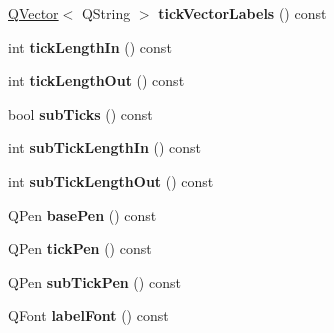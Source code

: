 \begin{DoxyCompactItemize}
\item 
\hyperlink{class_q_vector}{Q\+Vector}$<$ Q\+String $>$ {\bfseries tick\+Vector\+Labels} () const \hypertarget{class_q_c_p_axis_a64e6fa81f943ad33dcaf3fa606687b93}{}\label{class_q_c_p_axis_a64e6fa81f943ad33dcaf3fa606687b93}

\item 
int {\bfseries tick\+Length\+In} () const \hypertarget{class_q_c_p_axis_a59265d65c5034695ac2578bccbbb0f4a}{}\label{class_q_c_p_axis_a59265d65c5034695ac2578bccbbb0f4a}

\item 
int {\bfseries tick\+Length\+Out} () const \hypertarget{class_q_c_p_axis_ae1b3d7473f50ba8544b2027c1cdc80f2}{}\label{class_q_c_p_axis_ae1b3d7473f50ba8544b2027c1cdc80f2}

\item 
bool {\bfseries sub\+Ticks} () const \hypertarget{class_q_c_p_axis_ae957f44d2782a97d08fda8f0b2879d94}{}\label{class_q_c_p_axis_ae957f44d2782a97d08fda8f0b2879d94}

\item 
int {\bfseries sub\+Tick\+Length\+In} () const \hypertarget{class_q_c_p_axis_a052e6ab2ada7e87fa5e5831dcbd4a517}{}\label{class_q_c_p_axis_a052e6ab2ada7e87fa5e5831dcbd4a517}

\item 
int {\bfseries sub\+Tick\+Length\+Out} () const \hypertarget{class_q_c_p_axis_a091fdf8d1b3f9660e38b854578efb9bc}{}\label{class_q_c_p_axis_a091fdf8d1b3f9660e38b854578efb9bc}

\item 
Q\+Pen {\bfseries base\+Pen} () const \hypertarget{class_q_c_p_axis_a4f6a7cd46fb104b1dad93e29cc78fe74}{}\label{class_q_c_p_axis_a4f6a7cd46fb104b1dad93e29cc78fe74}

\item 
Q\+Pen {\bfseries tick\+Pen} () const \hypertarget{class_q_c_p_axis_a5eb206da4265c6c083db71d692da3bc4}{}\label{class_q_c_p_axis_a5eb206da4265c6c083db71d692da3bc4}

\item 
Q\+Pen {\bfseries sub\+Tick\+Pen} () const \hypertarget{class_q_c_p_axis_a2e8bce6dd03e393dbdf6bb427461a726}{}\label{class_q_c_p_axis_a2e8bce6dd03e393dbdf6bb427461a726}

\item 
Q\+Font {\bfseries label\+Font} () const \hypertarget{class_q_c_p_axis_ae8029ae0b32e9d4d73dddcdd0a08c838}{}\label{class_q_c_p_axis_ae8029ae0b32e9d4d73dddcdd0a08c838}


\end{DoxyCompactItemize}
